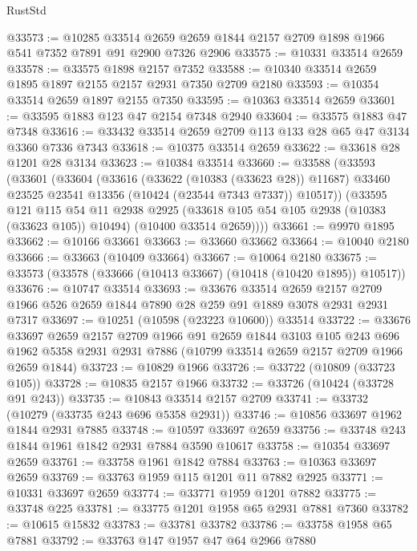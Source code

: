 \begin{lexlean}{RustStd}
\begin{coremodule}
@33573 := @10285
    @33514
    @2659
    @2659
    @1844
    @2157
    @2709
    @1898
    @1966
    @541
    @7352
    @7891
    @91
    @2900
    @7326
    @2906
@33575 := @10331 @33514 @2659
@33578 := @33575 @1898 @2157 @7352
@33588 := @10340 @33514 @2659 @1895 @1897 @2155 @2157 @2931 @7350 @2709 @2180
@33593 := @10354 @33514 @2659 @1897 @2155 @7350
@33595 := @10363 @33514 @2659
@33601 := @33595 @1883 @123 @47 @2154 @7348 @2940
@33604 := @33575 @1883 @47 @7348
@33616 := @33432 @33514 @2659 @2709 @113 @133 @28 @65 @47 @3134 @3360 @7336 @7343
@33618 := @10375 @33514 @2659
@33622 := @33618 @28 @1201 @28 @3134
@33623 := @10384 @33514
@33660 := @33588
    (@33593
      (@33601
        (@33604
          (@33616
            (@33622 (@10383 (@33623 @28)) @11687)
            @33460
            @23525
            @23541
            @13356
            (@10424 (@23544 @7343 @7337))
            @10517))
        (@33595
          @121
          @115
          @54
          @11
          @2938
          @2925
          (@33618 @105 @54 @105 @2938 (@10383 (@33623 @105)) @10494)
          (@10400 @33514 @2659))))
@33661 := @9970 @1895
@33662 := @10166 @33661
@33663 := @33660 @33662
@33664 := @10040 @2180
@33666 := @33663 (@10409 @33664)
@33667 := @10064 @2180
@33675 := @33573 (@33578 (@33666 (@10413 @33667) (@10418 (@10420 @1895)) @10517))
@33676 := @10747 @33514
@33693 := @33676
    @33514
    @2659
    @2157
    @2709
    @1966
    @526
    @2659
    @1844
    @7890
    @28
    @259
    @91
    @1889
    @3078
    @2931
    @2931
    @7317
@33697 := @10251 (@10598 (@23223 @10600)) @33514
@33722 := @33676
    @33697
    @2659
    @2157
    @2709
    @1966
    @91
    @2659
    @1844
    @3103
    @105
    @243
    @696
    @1962
    @5358
    @2931
    @2931
    @7886
    (@10799 @33514 @2659 @2157 @2709 @1966 @2659 @1844)
@33723 := @10829 @1966
@33726 := @33722 (@10809 (@33723 @105))
@33728 := @10835 @2157 @1966
@33732 := @33726 (@10424 (@33728 @91 @243))
@33735 := @10843 @33514 @2157 @2709
@33741 := @33732 (@10279 (@33735 @243 @696 @5358 @2931))
@33746 := @10856 @33697 @1962 @1844 @2931 @7885
@33748 := @10597 @33697 @2659
@33756 := @33748 @243 @1844 @1961 @1842 @2931 @7884 @3590 @10617
@33758 := @10354 @33697 @2659
@33761 := @33758 @1961 @1842 @7884
@33763 := @10363 @33697 @2659
@33769 := @33763 @1959 @115 @1201 @11 @7882 @2925
@33771 := @10331 @33697 @2659
@33774 := @33771 @1959 @1201 @7882
@33775 := @33748 @225
@33781 := @33775 @1201 @1958 @65 @2931 @7881 @7360
@33782 := @10615 @15832
@33783 := @33781 @33782
@33786 := @33758 @1958 @65 @7881
@33792 := @33763 @147 @1957 @47 @64 @2966 @7880

\end{coremodule}
\end{lexlean}
